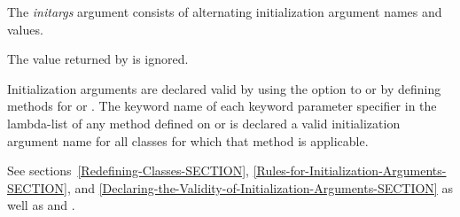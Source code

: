 \begin{defun}
The \emph{initargs\/} argument consists of alternating initialization
argument names and values.


The value returned by  is ignored.


Initialization arguments are declared valid by using the 
 option to  or by defining methods for 
 or .  The
keyword name of each keyword parameter specifier in the lambda-list of
any method defined on  or 
 is declared a valid initialization argument name
for all classes for which that method is applicable.


See sections~\ref{Redefining-Classes-SECTION},
\ref{Rules-for-Initialization-Arguments-SECTION}, and
\ref{Declaring-the-Validity-of-Initialization-Arguments-SECTION} as well as
 and .



\end{defun}
